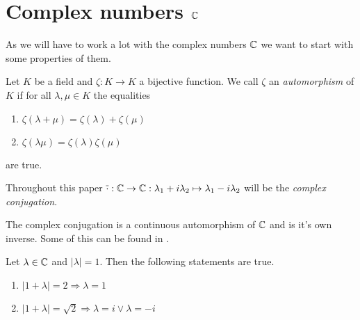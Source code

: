 \section{Complex numbers $\mathbb{C}$}

As we will have to work a lot with the complex numbers $\mathbb{C}$ we want to start with some properties of them. 

\begin{definition}
	Let $K$ be a field and $\zeta: K \to K$ a bijective function. We call $\zeta$ an \textit{automorphism} of $K$ if for all $\lambda, \mu \in K$ the equalities
	\begin{enumerate}
		\item $\zeta(\lambda + \mu) = \zeta(\lambda) + \zeta(\mu)$
		\item $\zeta(\lambda \mu) = \zeta(\lambda) \zeta(\mu)$
	\end{enumerate}
	are true.
	
\end{definition}

\begin{definition}
	Throughout this paper $\overline{\cdot}: \mathbb{C} \to \mathbb{C}: \lambda_1 + i \lambda_2 \mapsto \lambda_1 - i \lambda_2$ will be the \textit{complex conjugation}.
\end{definition}

\begin{remark}
	The complex conjugation is a continuous automorphism of $\mathbb{C}$ and is it's own inverse. Some of this can be found in \cite[p.40]{LinAG1&2}.
\end{remark}




\begin{lemma} \label{lemma:complex_geom}
	Let $\lambda \in \mathbb{C}$ and $|\lambda| = 1$. Then the following statements are true.
	\begin{enumerate}
		\item $|1 + \lambda| = 2 \Rightarrow \lambda = 1$
		\item $|1 + \lambda| = \sqrt{2} \Rightarrow \lambda = i \lor \lambda = -i$
	\end{enumerate}
\end{lemma}

